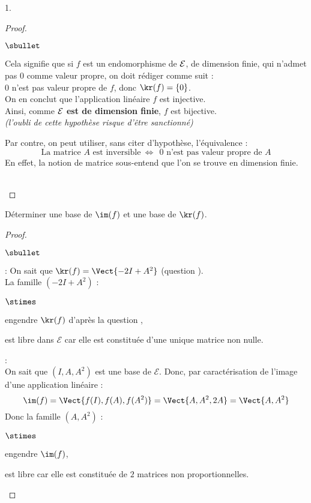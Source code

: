 \documentclass[11pt]{article}%
\begin{document}
\begin{noliste}{1.}
\begin{proof}
\begin{remark}
\begin{noliste}{$\sbullet$}
      \item Cela signifie que si $f$ est un endomorphisme de ${\cal
          E}$, de dimension finie, qui n'admet pas $0$ comme valeur
        propre, on doit rédiger comme suit :\\[.2cm]
        $0$ n'est pas valeur propre de $f$, donc $\kr(f) = \{0\}$.\\
        On en conclut que l'application linéaire $f$ est injective.\\
        Ainsi, comme {\bf ${\cal E}$ est de dimension finie}, $f$ est
        bijective.\\
        {\it (l'oubli de cette hypothèse risque d'être sanctionné)}
        
      \item Par contre, on peut utiliser, sans citer d'hypothèse,
      l'équivalence :
        \[
        \text{La matrice $A$ est inversible} \ \Leftrightarrow \ \
        \text{$0$ n'est pas valeur propre de $A$}
        \]
        En effet, la notion de matrice sous-entend que l'on se trouve
        en dimension finie.
      \end{noliste}
    \end{remark}~\\[-1.4cm]
\end{proof}

\item Déterminer une base de $\im(f)$ et une base de 
$\kr(f)$.

\begin{proof}~
  \begin{noliste}{$\sbullet$}
   \item {} :
   On sait que $\kr(f)=\Vect{-2I+A^2}$ (question ).\\[.2cm]
   La famille $(-2I+A^2)$ :
   \begin{noliste}{$\stimes$}
    \item engendre $\kr(f)$ d'après la question ,
    \item est libre dans $\mathcal{E}$ car elle est constituée d'une 
    unique matrice non nulle.
   \end{noliste}
   
   \item {} :\\[.1cm]
   On sait que $(I,A,A^2)$ est une base de $\mathcal{E}$. Donc, par 
   caractérisation de l'image d'une application linéaire :
 \[
  \im(f)=\Vect{f(I),f(A),f(A^2)} = \Vect{A,A^2,2A}=\Vect{A,A^2}
 \]
 Donc la famille $(A,A^2)$ :
 \begin{noliste}{$\stimes$}
  \item engendre $\im(f)$,
  \item est libre car elle est constituée de $2$ matrices non 
  proportionnelles.
 \end{noliste}
  \end{noliste}
  

\end{proof}
\end{noliste}
\end{document}

